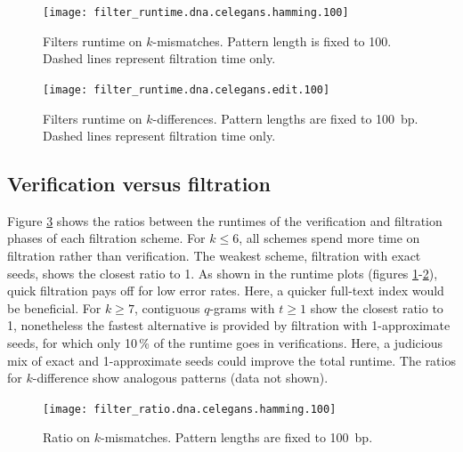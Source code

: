 \begin{figure}[h]
\begin{center}
\caption[Filters runtime on $k$-mismatches]{Filters runtime on $k$-mismatches. Pattern length is fixed to 100. Dashed lines represent filtration time only.}
\label{fig:filter-runtime-hamming-celegans}
\texttt{[image: filter\_runtime.dna.celegans.hamming.100]}
\end{center}
\end{figure}

\begin{figure}[h]
\begin{center}
\caption[Filters runtime on $k$-differences]{Filters runtime on $k$-differences. Pattern lengths are fixed to 100~bp. Dashed lines represent filtration time only.}
\label{fig:filter-runtime-edit-celegans}
\texttt{[image: filter\_runtime.dna.celegans.edit.100]}
\end{center}
\end{figure}

\subsection{Verification versus filtration}

Figure \ref{fig:filter-ratio-hamming-celegans} shows the ratios between the runtimes of the verification and filtration phases of each filtration scheme.
For $k \leq 6$, all schemes spend more time on filtration rather than verification.
The weakest scheme, filtration with exact seeds, shows the closest ratio to 1.
As shown in the runtime plots (figures \ref{fig:filter-runtime-hamming-celegans}-\ref{fig:filter-runtime-edit-celegans}), quick filtration pays off for low error rates.
Here, a quicker full-text index would be beneficial.
For $k \geq 7$, contiguous $q$-grams with $t \geq 1$ show the closest ratio to 1, nonetheless the fastest alternative is provided by filtration with 1-approximate seeds, for which only 10\,\% of the runtime goes in verifications.
Here, a judicious mix of exact and 1-approximate seeds could improve the total runtime.
The ratios for $k$-difference show analogous patterns (data not shown).

\begin{figure}[h]
\begin{center}
\caption[Ratio on $k$-mismatches]{Ratio on $k$-mismatches. Pattern lengths are fixed to 100~bp.}
\label{fig:filter-ratio-hamming-celegans}
\texttt{[image: filter\_ratio.dna.celegans.hamming.100]}
\end{center}
\end{figure}

